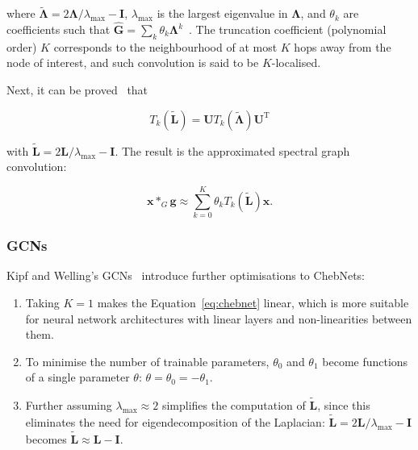 where $\mathbf{\tilde{\Lambda}} = 2\mathbf{\Lambda}/\lambda_{\mathrm{max}} - \mathbf{I}$, $\lambda_\mathrm{max}$ is the largest eigenvalue in $\mathbf{\Lambda}$, and $\theta_k$ are coefficients such that $\mathbf{\hat{G}} = \sum_k \theta_k \mathbf{\Lambda}^k$~\cite{wu2019simplifying}. The truncation coefficient (polynomial order) $K$ corresponds to the neighbourhood of at most $K$ hops away from the node of interest, and such convolution is said to be $K$-localised. 

Next, it can be proved~\cite{wu2019comprehensive} that

\begin{equation}
    T_k(\mathbf{\tilde{L}}) = \mathbf{U}T_k(\mathbf{\tilde{\Lambda}})\mathbf{U}^{\mathrm{T}}
\end{equation}

with $\mathbf{\tilde{L}} = 2\mathbf{L}/\lambda_{\mathrm{max}} - \mathbf{I}$. The result is the approximated spectral graph convolution:

\begin{equation}
    \label{eq:chebnet}
    \mathbf{x} *_G \mathbf{g} \approx \sum_{k=0}^{K}\theta_k T_k(\mathbf{\tilde{L}})\mathbf{x}.
\end{equation}


\subsubsection{GCNs}
Kipf and Welling's GCNs~\cite{kipf2017semi} introduce further optimisations to ChebNets: 
\begin{enumerate}
    \item Taking $K=1$ makes the Equation~\eqref{eq:chebnet} linear, which is more suitable for neural network architectures with linear layers and non-linearities between them.
    \item To minimise the number of trainable parameters, $\theta_0$ and $\theta_1$ become functions of a single parameter $\theta$: $\theta = \theta_0 = -\theta_1$.
    \item Further assuming $\lambda_{\mathrm{max}}\approx 2$ simplifies the computation of $\mathbf{\tilde{L}}$, since this eliminates the need for eigendecomposition of the Laplacian: $\mathbf{\tilde{L}} = 2\mathbf{L}/\lambda_{\mathrm{max}} - \mathbf{I}$ becomes $\mathbf{\tilde{L}} \approx \mathbf{L} - \mathbf{I}$.
\end{enumerate}

